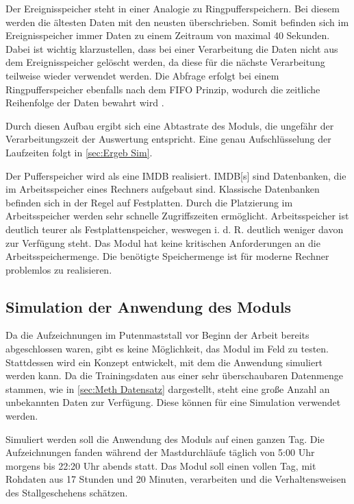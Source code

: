 Der Ereignisspeicher steht in einer Analogie zu Ringpufferspeichern. Bei diesem werden die ältesten Daten mit den neusten überschrieben. Somit befinden sich im Ereignisspeicher immer Daten zu einem Zeitraum von maximal 40 Sekunden. Dabei ist wichtig klarzustellen, dass bei einer Verarbeitung die Daten nicht aus dem Ereignisspeicher gelöscht werden, da diese für die nächste Verarbeitung teilweise wieder verwendet werden. Die Abfrage erfolgt bei einem Ringpufferspeicher ebenfalls nach dem \acrshort{FIFO} Prinzip, wodurch die zeitliche Reihenfolge der Daten bewahrt wird \cite{Sedgewick.2011}.\par

Durch diesen Aufbau ergibt sich eine Abtastrate des Moduls, die ungefähr der Verarbeitungszeit der Auswertung entspricht. Eine genau Aufschlüsselung der Laufzeiten folgt in \autoref{sec:Ergeb Sim}. \par

Der Pufferspeicher wird als eine \gls{IMDB} realisiert. \gls{IMDB}[s] sind Datenbanken, die im Arbeitsspeicher eines Rechners aufgebaut sind. Klassische Datenbanken befinden sich in der Regel auf Festplatten. Durch die Platzierung im Arbeitsspeicher werden sehr schnelle Zugriffszeiten ermöglicht. Arbeitsspeicher ist deutlich teurer als Festplattenspeicher, weswegen i. d. R. deutlich weniger davon zur Verfügung steht. Das Modul hat keine kritischen Anforderungen an die Arbeitsspeichermenge. Die benötigte Speichermenge ist für moderne Rechner problemlos zu realisieren. \par


\subsection{Simulation der Anwendung des Moduls} \label{sec:Meth Sim}
Da die Aufzeichnungen im Putenmaststall vor Beginn der Arbeit bereits abgeschlossen waren, gibt es keine Möglichkeit, das Modul im Feld zu testen. Stattdessen wird ein Konzept entwickelt, mit dem die Anwendung simuliert werden kann. Da die Trainingsdaten aus einer sehr überschaubaren Datenmenge stammen, wie in \autoref{sec:Meth Datensatz} dargestellt, steht eine große Anzahl an unbekannten Daten zur Verfügung. Diese können für eine Simulation verwendet werden. \par

Simuliert werden soll die Anwendung des Moduls auf einen ganzen Tag. Die Aufzeichnungen fanden während der Mastdurchläufe täglich von 5:00 Uhr morgens bis 22:20 Uhr abends statt. Das Modul soll einen vollen Tag, mit Rohdaten aus 17 Stunden und 20 Minuten, verarbeiten und die Verhaltensweisen des Stallgeschehens schätzen.\par

